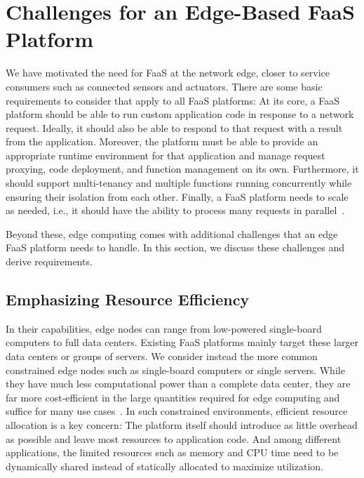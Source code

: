 \cleardoublepage
\chapter{Challenges for an Edge-Based FaaS Platform}
\label{cha:background}

We have motivated the need for FaaS at the network edge, closer to service consumers such as connected sensors and actuators.
There are some basic requirements to consider that apply to all FaaS platforms:
At its core, a FaaS platform should be able to run custom application code in response to a network request.
Ideally, it should also be able to respond to that request with a result from the application.
Moreover, the platform must be able to provide an appropriate runtime environment for that application and manage request proxying, code deployment, and function management on its own.
Furthermore, it should support multi-tenancy and multiple functions running concurrently while ensuring their isolation from each other.
Finally, a FaaS platform needs to scale as needed, i.e., it should have the ability to process many requests in parallel~\cite{Baldini2017-zf}.

Beyond these, edge computing comes with additional challenges that an edge FaaS platform needs to handle.
In this section, we discuss these challenges and derive requirements.

\section{Emphasizing Resource Efficiency}
\label{sec:efficiency}

In their capabilities, edge nodes can range from low-powered single-board computers to full data centers.
Existing FaaS platforms mainly target these larger data centers or groups of servers.
We consider instead the more common constrained edge nodes such as single-board computers or single servers.
While they have much less computational power than a complete data center, they are far more cost-efficient in the large quantities required for edge computing and suffice for many use cases~\cite{paper_bermbach_fog_computing}.
In such constrained environments, efficient resource allocation is a key concern:
The platform itself should introduce as little overhead as possible and leave most resources to application code.
And among different applications, the limited resources such as memory and CPU time need to be dynamically shared instead of statically allocated to maximize utilization.

